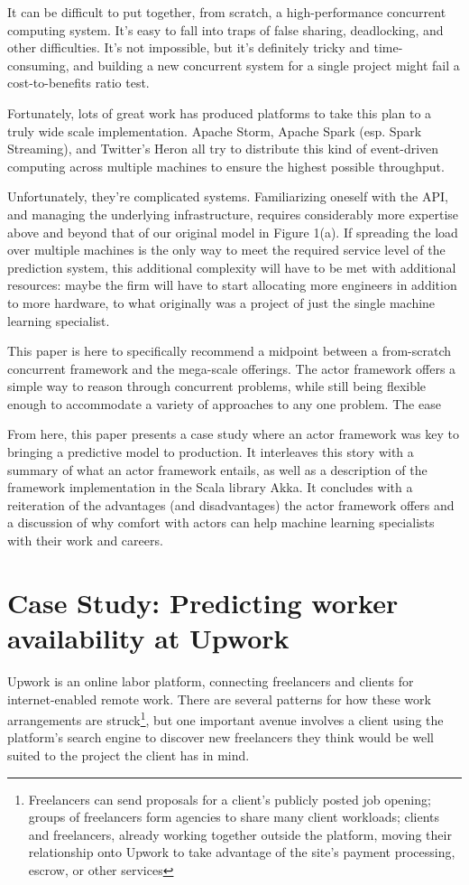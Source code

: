 \documentclass{article}
\begin{document}
 It can be difficult to put together, from scratch, a high-performance
concurrent computing system. It's easy to fall into traps of false sharing,
deadlocking, and other difficulties. It's not impossible, but it's definitely
tricky and time-consuming, and building a new concurrent system for a single
project might fail a cost-to-benefits ratio test.

 Fortunately, lots of great work has produced platforms to take this plan to a
truly wide scale implementation. Apache Storm, Apache Spark (esp. Spark
Streaming), and Twitter's Heron all try to distribute this kind of event-driven
computing across multiple machines to ensure the highest possible throughput.

 Unfortunately, they're complicated systems. Familiarizing oneself with the API,
and managing the underlying infrastructure, requires considerably more expertise
above and beyond that of our original model in Figure 1(a). If spreading the
load over multiple machines is the only way to meet the required service level
of the prediction system, this additional complexity will have to be met with
additional resources: maybe the firm will have to start allocating more
engineers in addition to more hardware, to what originally was a project of just
the single machine learning specialist.

 This paper is here to specifically recommend a midpoint between a from-scratch
concurrent framework and the mega-scale offerings. The actor framework offers a
simple way to reason through concurrent problems, while still being flexible
enough to accommodate a variety of approaches to any one problem. The ease

 From here, this paper presents a case study where an actor framework was key to
bringing a predictive model to production. It interleaves this story with a
summary of what an actor framework entails, as well as a description of the
framework implementation in the Scala library Akka. It concludes with a reiteration
of the advantages (and disadvantages) the actor framework offers and a
discussion of why comfort with actors can help machine learning specialists with
their work and careers.

\section{Case Study: Predicting worker availability at Upwork}

 Upwork is an online labor platform, connecting freelancers and clients for
internet-enabled remote work. There are several patterns for how these work
arrangements are struck\footnote{Freelancers can send proposals for a client's
publicly posted job opening; groups of freelancers form agencies to share many
client workloads; clients and freelancers, already working together outside the
platform, moving their relationship onto Upwork to take advantage of the site's
payment processing, escrow, or other services}, but one important avenue
involves a client using the platform's search engine to discover new freelancers
they think would be well suited to the project the client has in mind.
\end{document}
